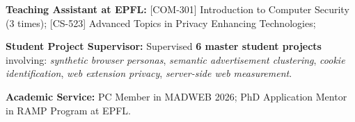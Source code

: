 
\noindent\textbf{Teaching Assistant at EPFL:}
% 
[COM-301] Introduction to Computer Security (3 times);
% 
[CS-523] Advanced Topics in Privacy Enhancing Technologies;

\noindent\textbf{Student Project Supervisor: }
% 
Supervised \textbf{6 master student projects} involving: \textit{synthetic browser personas}, \textit{semantic advertisement clustering}, \textit{cookie identification}, \textit{web extension privacy}, \textit{server-side web measurement}.

\noindent\textbf{Academic Service: } PC Member in MADWEB 2026; PhD Application Mentor in RAMP Program at EPFL.
